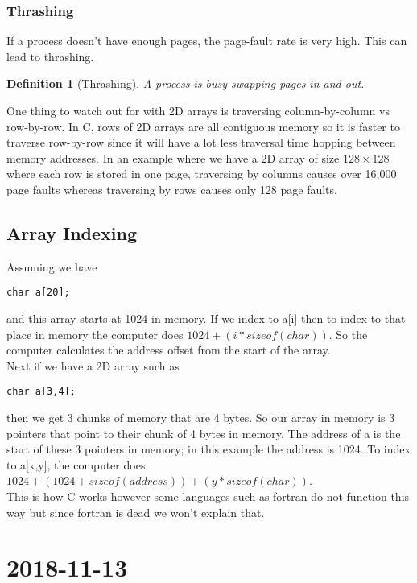 \documentclass{report}
\newtheorem*{defn}{Definition}
\newcommand{\mychapter}[2]{
	\setcounter{chapter}{#1}
	\setcounter{section}{0}
	\chapter*{#2}
	\addcontentsline{toc}{chapter}{#2}
}
\begin{document}
\subsection{Thrashing}
If a process doesn't have enough pages, the page-fault rate is very high. This can lead to thrashing.
\begin{defn}[Thrashing]
A process is busy swapping pages in and out.
\end{defn}

One thing to watch out for with 2D arrays is traversing column-by-column vs row-by-row. In C, rows of 2D arrays are all contiguous memory so it is faster to traverse row-by-row since it will have a lot less traversal time hopping between memory addresses. In an example where we have a 2D array of size $128\times 128$ where each row is stored in one page, traversing by columns causes over 16,000 page faults whereas traversing by rows causes only 128 page faults.

\section{Array Indexing}
Assuming we have
\begin{verbatim}
char a[20];
\end{verbatim}
and this array starts at 1024 in memory. If we index to a[i] then to index to that place in memory the computer does $1024+(i*sizeof(char))$. So the computer calculates the address offset from the start of the array.\\

Next if we have a 2D array such as
\begin{verbatim}
char a[3,4];
\end{verbatim}
then we get 3 chunks of memory that are 4 bytes. So our array in memory is 3 pointers that point to their chunk of 4 bytes in memory. The address of a is the start of these 3 pointers in memory; in this example the address is 1024. To index to a[x,y], the computer does $1024+(1024+sizeof(address)) + (y*sizeof(char))$.\\

This is how C works however some languages such as fortran do not function this way but since fortran is dead we won't explain that.\\




\mychapter{10}{2018-11-13}
\end{document}
